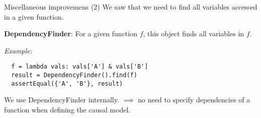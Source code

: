 \documentclass{beamer}
\begin{document}
\begin{frame}[fragile]{Miscellaneous improvemens (2)}
  We saw that we need to find all variables accessed in a given
  function.

  \vspace{1.5\baselineskip}

  \textbf{DependencyFinder}: For a given function $f$,
  this object finds all variables in $f$.

  \vspace{1.5\baselineskip}

  \textit{Example:}
  \begin{verbatim}
  f = lambda vals: vals['A'] & vals['B']
  result = DependencyFinder().find(f)
  assertEqual({'A', 'B'}, result)
  \end{verbatim}

  \vspace{1.5\baselineskip}

  We use DependencyFinder internally. $\implies$ no need to specify 
  dependencies of a function when defining the causal model.
\end{frame}
\end{document}

